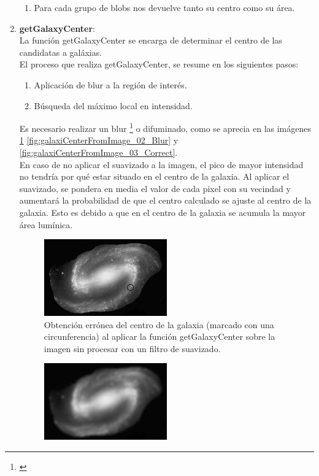 \begin{enumerate}
\begin{enumerate}
		
		\item Para cada grupo de blobs nos devuelve tanto su centro como su área.
	\end{enumerate}
	\item \textbf{getGalaxyCenter}:	\\
	La función {\scriptsize getGalaxyCenter} se encarga de determinar el centro de las candidatas a galáxias.\\
	El proceso que realiza {\scriptsize getGalaxyCenter}, se resume en los siguientes pasos:
	\begin{enumerate}
		\item Aplicación de blur a la región de interés.
		\item Búsqueda del máximo local en intensidad.
	\end{enumerate}
	Es necesario realizar un blur \footnote{\cite{OpenCV}} o difuminado, como se aprecia en las imágenes \ref{fig:galaxiCenterFromImage_01_ERROR} \ref{fig:galaxiCenterFromImage_02_Blur} y \ref{fig:galaxiCenterFromImage_03_Correct}.\\
	En caso de no aplicar el suavizado a la imagen, el pico de mayor intensidad no tendría por qué estar situado en el centro de la galaxia. Al aplicar el suavizado, se pondera en media el valor de cada pixel con su vecindad y aumentará la probabilidad de que el centro calculado se ajuste al centro de la galaxia. Esto es debido a que en el centro de la galaxia se acumula la mayor área lumínica.
	\begin{figure}[!htb]
		\centering
		\includegraphics[width=0.5\textwidth]{images/galaxiCenterFromImage_01_ERROR.png}
		\caption{\label{fig:galaxiCenterFromImage_01_ERROR}{\small Obtención errónea del centro de la galaxia (marcado con una circunferencia) al aplicar la función {\scriptsize getGalaxyCenter} sobre la imagen sin procesar con un filtro de suavizado.}}
	\end{figure}
	\begin{figure}[!htb]
		\centering
		\includegraphics[width=0.5\textwidth]{images/galaxiCenterFromImage_02_Blur.png}

\end{figure}
\end{enumerate}
